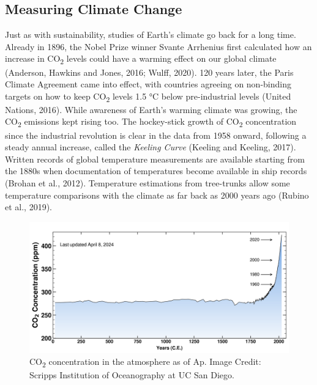 \documentclass[
  letterpaper,
  DIV=11,
  numbers=noendperiod]{scrartcl}
\begin{document}
\subsection{Measuring Climate Change}\label{measuring-climate-change}

Just as with sustainability, studies of Earth's climate go back for a
long time. Already in 1896, the Nobel Prize winner Svante Arrhenius
first calculated how an increase in CO\textsubscript{2} levels could
have a warming effect on our global climate (Anderson, Hawkins and
Jones, 2016; Wulff, 2020). 120 years later, the Paris Climate Agreement
came into effect, with countries agreeing on non-binding targets on how
to keep CO\textsubscript{2} levels 1.5 °C below pre-industrial levels
(United Nations, 2016). While awareness of Earth's warming climate was
growing, the CO\textsubscript{2} emissions kept rising too. The
hockey-stick growth of CO\textsubscript{2} concentration since the
industrial revolution is clear in the data from 1958 onward, following a
steady annual increase, called the \emph{Keeling Curve} (Keeling and
Keeling, 2017). Written records of global temperature measurements are
available starting from the 1880s when documentation of temperatures
become available in ship records (Brohan et al., 2012). Temperature
estimations from tree-trunks allow some temperature comparisons with the
climate as far back as 2000 years ago (Rubino et al., 2019).

\begin{figure}[H]

{\centering \includegraphics{./images/co2-concentration.png}

}

\caption{CO\textsubscript{2} concentration in the atmosphere as of Ap.
Image Credit: Scripps Institution of Oceanography at UC San Diego.}

\end{figure}%
\end{document}
